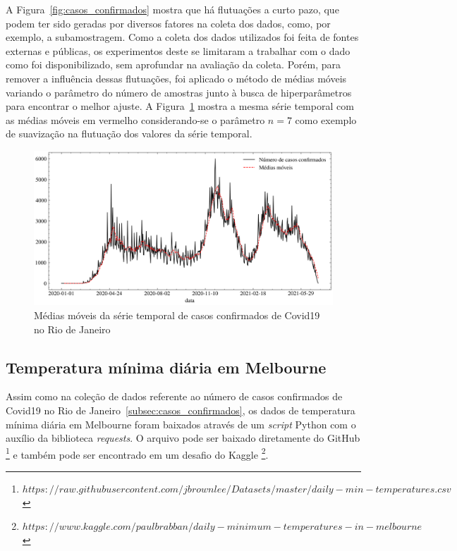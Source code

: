 A Figura~\ref{fig:casos_confirmados} mostra que há flutuações a curto pazo, que podem ter sido geradas por diversos fatores na coleta dos dados, como, por exemplo, a subamostragem. Como a coleta dos dados utilizados foi feita de fontes externas e públicas, os experimentos deste se limitaram a trabalhar com o dado como foi disponibilizado, sem aprofundar na avaliação da coleta. Porém, para remover a influência dessas flutuações, foi aplicado o método de médias móveis variando o parâmetro do número de amostras junto à busca de hiperparâmetros para encontrar o melhor ajuste. A Figura~\ref{fig:medias_moveis} mostra a mesma série temporal com as médias móveis em vermelho considerando-se o parâmetro $n=7$ como exemplo de suavização na flutuação dos valores da série temporal.

\begin{figure}[!htp] \label{fig:medias_moveis}
    \centering
    \includegraphics[width=5.0in]{img/medias_moveis.png}
    \caption{Médias móveis da série temporal de casos confirmados de Covid19 no Rio de Janeiro}
\end{figure}

\subsection{Temperatura mínima diária em Melbourne}
Assim como na coleção de dados referente ao número de casos confirmados de Covid19 no Rio de Janeiro~\ref{subsec:casos_confirmados}, os dados de temperatura mínima diária em Melbourne foram baixados através de um \textit{script} Python com o auxílio da biblioteca \textit{requests}. O arquivo pode ser baixado diretamente do GitHub \footnote{$https://raw.githubusercontent.com/jbrownlee/Datasets/master/daily-min-temperatures.csv$} e também pode ser encontrado em um desafio do Kaggle \footnote{$https://www.kaggle.com/paulbrabban/daily-minimum-temperatures-in-melbourne$}.

